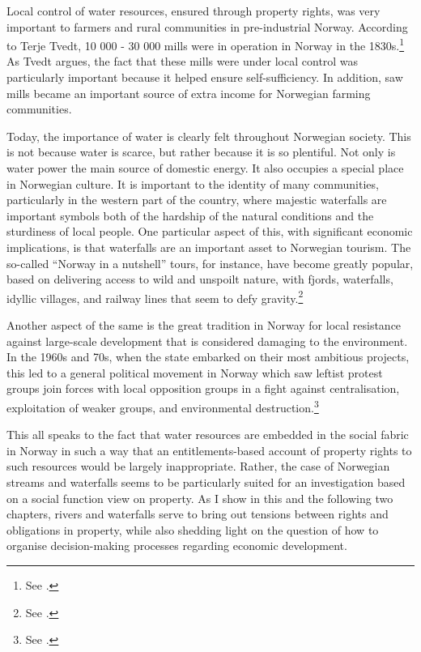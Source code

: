 Local control of water resources, ensured through property rights, was very important to farmers and rural communities in pre-industrial Norway. According to Terje Tvedt, 10 000 - 30 000 mills were in operation in Norway in the 1830s.\footnote{See \cite[121]{tvedt13}.} As Tvedt argues, the fact that these mills were under local control was particularly important because it helped ensure self-sufficiency. In addition, saw mills became an important source of extra income for Norwegian farming communities.

Today, the importance of water is clearly felt throughout Norwegian society. This is not because water is scarce, but rather because it is so plentiful. Not only is water power the main source of domestic energy. It also occupies a special place in Norwegian culture. It is important to the identity of many communities, particularly in the western part of the country, where majestic waterfalls are important symbols both of the hardship of the natural conditions and the sturdiness of local people. One particular aspect of this, with significant economic implications, is that waterfalls are an important asset to Norwegian tourism. The so-called ``Norway in a nutshell'' tours, for instance, have become greatly popular, based on delivering access to wild and unspoilt nature, with fjords, waterfalls, idyllic villages, and railway lines that seem to defy gravity.\footnote{See \cite{nutshell}.}

Another aspect of the same is the great tradition in Norway for local resistance against large-scale development that is considered damaging to the environment. In the 1960s and 70s, when the state embarked on their most ambitious projects, this led to a general political movement in Norway which saw  leftist protest groups join forces with local opposition groups in a fight against centralisation, exploitation of weaker groups, and environmental destruction.\footnote{See \cite{nilsen08}.}

This all speaks to the fact that water resources are embedded in the social fabric in Norway in such a way that an entitlements-based account of property rights to such resources would be largely inappropriate. Rather, the case of Norwegian streams and waterfalls seems to be particularly suited for an investigation based on a social function view on property. As I show in this and the following two chapters, rivers and waterfalls serve to bring out tensions between rights and obligations in property, while also shedding light on the question of how to organise decision-making processes regarding economic development.

